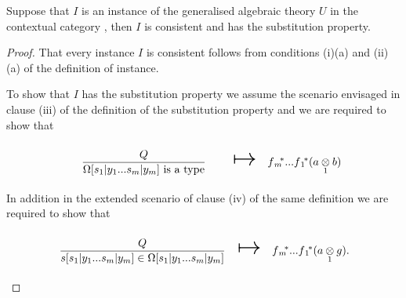 \begin{lemma}
Suppose that $I$ is an instance of the generalised algebraic theory $U$ in the contextual category \catc,
then $I$ is consistent and has the substitution property.
\end{lemma}
\begin{proof}

That every instance $I$ is consistent follows from conditions (i)(a) and (ii)(a) of the definition of instance. 


\newcommand {\forceSOURCEwidth}{\rule{5cm}{0pt}}  %
\newcommand {\forceTARGETwidth}{\rule{2.2cm}{0pt}}
\newcommand{\sonerule} {\gatdisplayrule{Q}         {\ofT{s_1}{\Omega_1}}}
\newcommand{\stworule}  {\gatdisplayrule{Q}       {\ofT{s_2}{\Omega_2[s_1|y_1]}}}
\newcommand{\weakenedOmegarule}{\gatdisplayrule{Q,\, \yOmega{m}} {\isT{\Omega}} }
\newcommand{\weakenedsrule}    {\gatdisplayrule{Q,\, \yOmega{m}} {\ofT{s}{\Omega}} }
\newcommand{\weakenedOmegaruleFirstsubstitution}{\gatdisplayrule{Q,\, \ofT{y_2}{\Omega_2[s_1|y_1]},\,...\,\ofT{y_m}{\Omega_m[s_1|y_1]}}{\isT{\Omega[s_1|y_1]}} }
\newcommand{\weakenedsruleFirstsubstitution}{\gatdisplayrule{Q,\, \ofT{y_2}{\Omega_2[s_1|y_1]},\,...\,\ofT{y_m}{\Omega_m[s_1|y_1]}}{\ofT{s[s_1|y_1]}{\Omega[s_1|y_1]}} }
\newcommand{\weakenedOmegaruleSecondsubstitution}{\gatdisplayrule{Q,\, \ofT{y_3}{\Omega_2[s_1|y_1, s_2|y_2]},\,...\,\ofT{y_m}{\Omega_m[s_1|y_1, s_2|y_2]}}{\isT{\Omega[s_1|y_1, s_2|y_2]}} }
\newcommand{\weakenedsruleSecondsubstitution}{\gatdisplayrule{Q,\, \ofT{y_2}{\Omega_2[s_1|y_1, s_2|y_2]},\,...\,\ofT{y_m}{\Omega_m[s_1|y_1, s_2|y_2]}}{\ofT{s[s_1|y_1, s_2|y_2]}{\Omega[s_1|y_1, s_2|y_2]}} }


To show that $I$ has the substitution property we assume the scenario envisaged in clause (iii) of the definition of the substitution property
and we are required to show that
\begin{equation}
\label{substitutionmappingone}
\begin{array}{c c c}
\forceSOURCEwidth & & \forceTARGETwidth \\ [-0.1cm]
\omegarulesubstituted  & \Imapsto & \fmstar...\fonestar (\crossx{a}{b}{1})  
\end{array}
\end{equation}
In addition in the extended scenario of clause (iv) of the same definition  we are required to show that
\begin{equation}
\label{substitutionmappingtwo}
\begin{array}{c c c}
\forceSOURCEwidth & & \forceTARGETwidth \\ [-0.1cm]
\srulesubstituted & \Imapsto & \fmstar...\fonestar (\crossx{a}{g}{1}).  
\end{array}
\end{equation}


\end{proof}
